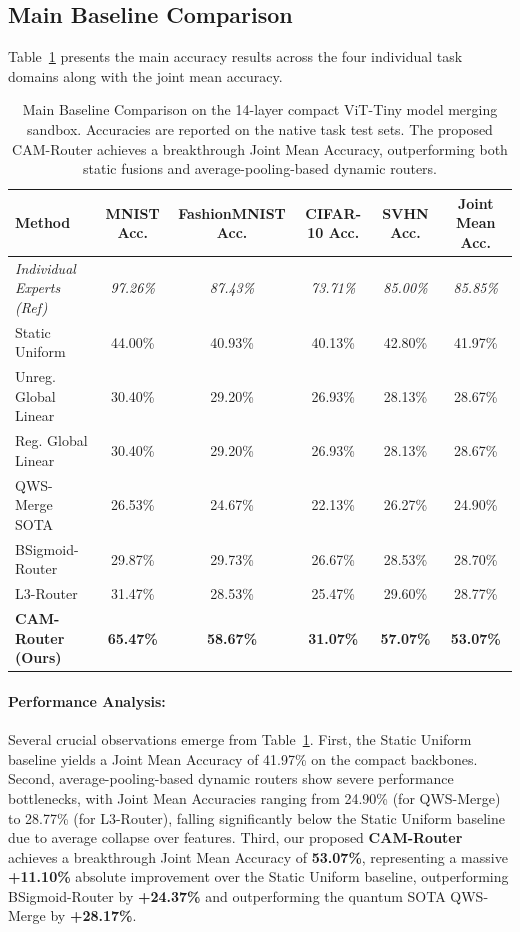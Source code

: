 \subsection{Main Baseline Comparison}
Table~\ref{tab:main_comparison} presents the main accuracy results across the four individual task domains along with the joint mean accuracy.

\begin{table}[t]
\centering
\caption{Main Baseline Comparison on the 14-layer compact ViT-Tiny model merging sandbox. Accuracies are reported on the native task test sets. The proposed CAM-Router achieves a breakthrough Joint Mean Accuracy, outperforming both static fusions and average-pooling-based dynamic routers.}
\label{tab:main_comparison}
\vskip 0.15in
\begin{small}
\begin{tabular}{lccccc}
\toprule
\textbf{Method} & \textbf{MNIST Acc.} & \textbf{FashionMNIST Acc.} & \textbf{CIFAR-10 Acc.} & \textbf{SVHN Acc.} & \textbf{Joint Mean Acc.} \\
\midrule
\textit{Individual Experts (Ref)} & \textit{97.26\%} & \textit{87.43\%} & \textit{73.71\%} & \textit{85.00\%} & \textit{85.85\%} \\
\midrule
Static Uniform & 44.00\% & 40.93\% & 40.13\% & 42.80\% & 41.97\% \\
Unreg. Global Linear & 30.40\% & 29.20\% & 26.93\% & 28.13\% & 28.67\% \\
Reg. Global Linear & 30.40\% & 29.20\% & 26.93\% & 28.13\% & 28.67\% \\
QWS-Merge SOTA & 26.53\% & 24.67\% & 22.13\% & 26.27\% & 24.90\% \\
BSigmoid-Router & 29.87\% & 29.73\% & 26.67\% & 28.53\% & 28.70\% \\
L3-Router & 31.47\% & 28.53\% & 25.47\% & 29.60\% & 28.77\% \\
\midrule
\textbf{CAM-Router (Ours)} & \textbf{65.47\%} & \textbf{58.67\%} & \textbf{31.07\%} & \textbf{57.07\%} & \textbf{53.07\%} \\
\bottomrule
\end{tabular}
\end{small}
\vskip -0.1in
\end{table}

\paragraph{Performance Analysis:} 
Several crucial observations emerge from Table~\ref{tab:main_comparison}. 
First, the Static Uniform baseline yields a Joint Mean Accuracy of 41.97\% on the compact backbones.
Second, average-pooling-based dynamic routers show severe performance bottlenecks, with Joint Mean Accuracies ranging from 24.90\% (for QWS-Merge) to 28.77\% (for L3-Router), falling significantly below the Static Uniform baseline due to average collapse over features.
Third, our proposed \textbf{CAM-Router} achieves a breakthrough Joint Mean Accuracy of \textbf{53.07\%}, representing a massive \textbf{+11.10\%} absolute improvement over the Static Uniform baseline, outperforming BSigmoid-Router by \textbf{+24.37\%} and outperforming the quantum SOTA QWS-Merge by \textbf{+28.17\%}. 

